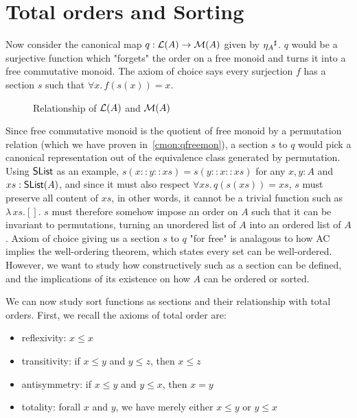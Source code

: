 \section{Total orders and Sorting}
\label{sec:sorting}

Now consider the canonical map $q : \mathcal{L}(A) \to \mathcal{M}(A)$ given by ${\eta_A}^{\sharp}$. $q$ would be a surjective
function which "forgets" the order on a free monoid and turns it into a free commutative monoid.
The axiom of choice says every surjection $f$ has a section $s$ such that $\forall x.\, f(s(x)) = x$.

\begin{figure}[H]
    \centering
    \caption{Relationship of $\mathcal{L}(A)$ and $\mathcal{M}(A)$}
    \label{fig:enter-label}
\end{figure}

Since free commutative monoid is the quotient of free monoid by a permutation relation
(which we have proven in~\cref{cmon:qfreemon}), a section $s$ to $q$ would pick a canonical representation
out of the equivalence class generated by permutation.
Using $\operatorname{\mathsf{SList}}$ as an example, $s(x :: y :: xs) = s(y :: x :: xs)$ for any $x, y : A$ and $xs : \operatorname{\mathsf{SList}}(A)$,
and since it must also respect $\forall xs.\,q(s(xs)) = xs$, $s$ must preserve all content of $xs$,
in other words, it cannot be a trivial function such as $\lambda\,xs. []$.
$s$ must therefore
somehow impose an order on $A$ such that it can be invariant to permutations, turning an unordered list of $A$
into an ordered list of $A$. Axiom of choice giving us a section $s$ to $q$ "for free" is analagous to how
AC implies the well-ordering theorem, which states every set can be well-ordered. However, we want to study
how constructively such as a section can be defined, and the implications of its existence on how $A$
can be ordered or sorted.

We can now study sort functions as sections and their relationship with total orders.
First, we recall the axioms of total order are:
\begin{itemize}
    \item reflexivity: $x \leq x$
    \item transitivity: if $x \leq y$ and $y \leq z$, then $x \leq z$
    \item antisymmetry: if $x \leq y$ and $y \leq x$, then $x = y$
    \item totality: forall $x$ and $y$, we have merely either $x \leq y$ or $y \leq x$ 
\end{itemize}

